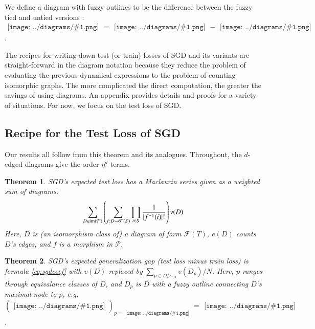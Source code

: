 \documentclass{article}
\newtheorem{thm}{Theorem}
\newcommand{\Free}{\mathcal{F}}
\newcommand{\image}{\text{\textnormal{im}}}
\newcommand{\Pp}{\mathcal{P}}
\newcommand{\sdia}[1]{\begin{gathered}\texttt{[image: ../diagrams/\#1.png]}\end{gathered}}
\begin{document}
    We define a diagram with fuzzy outlines to be the difference between the
    fuzzy tied and untied versions : $\sdia{c(01-2)(01-12)} =
    \sdia{(01-2)(01-12)}-\sdia{(0-1-2)(01-12)}$. 
    
    The recipes for writing down test (or train) losses of SGD and its variants
    are straight-forward in the diagram notation because they reduce the
    problem of evaluating the previous dynamical expressions to the problem of
    counting isomorphic graphs.  The more complicated the direct computation,
    the greater the savings of using diagrams.  An appendix provides details
    and proofs for a variety of situations.  For now, we focus on the test loss
    of SGD.

\subsection{Recipe for the Test Loss of SGD}
    Our results all follow from this theorem and its analogues.
    Throughout, the $d$-edged diagrams give the order $\eta^d$ terms. 
    \begin{thm} \label{thm:test}
        SGD's expected test loss has a Maclaurin series
        given as a weighted sum of diagrams:
        \begin{equation}\label{eq:sgdcoef}
            \sum_{D \in \image(\Free)}
            \left(
                \sum_{f: D\to\Free(S)}
                \prod_{i\in S} \frac{1}{|f^{-1}(i)|!}
            \right)
            v(D) 
        \end{equation}
        Here, $D$ is (an isomorphism class of) a diagram of form
        $\Free(T)$, $e(D)$ counts $D$'s edges, and $f$ is a  
        morphism in $\Pp$.
    \end{thm}
    \begin{thm}
        SGD's expected generalization gap (test loss minus train loss) is
        formula \ref{eq:sgdcoef} with $v(D)$ replaced by
        $
            \sum_{p \in D/\sim_D} v(D_p)/N
        $.
        Here, $p$ ranges through equivalance classes of $D$, and $D_p$ is $D$
        with a fuzzy outline connecting $D$'s maximal node to $p$,
        e.g. $(\sdia{(0-1)(01)})_{p=\sdia{(0)()}} = \sdia{c(01)(01)}$.
    \end{thm}
\end{document}
